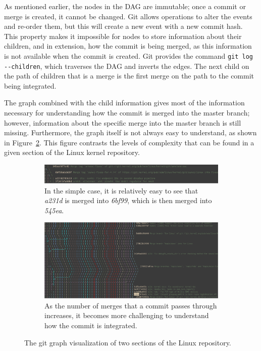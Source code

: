 As mentioned earlier, the nodes in the DAG are immutable;
once a commit or merge is created, it cannot be changed.
Git allows operations to alter the events and re-order them,
but this will create a new event with a new commit hash.
This property makes it impossible for nodes to store information about
their children, and in extension, how the commit is being merged, as
this information is not available when the commit is created.
Git provides the command \verb|git log --children|, which traverses the
DAG and inverts the edges.
The next child on the path of children that is a merge is the first
merge on the path to the commit being integrated.

The graph combined with the child information gives most of the
information necessary for understanding how the commit is
merged into the master branch; however, information about the specific
merge into the master branch is still missing.
Furthermore, the graph itself is not always easy to understand, as shown
in Figure~\ref{fig:git_graphs}.
This figure contrasts the levels of complexity that can be found in a
given section of the Linux kernel repository.

\begin{figure}[htpb]
  \centering
  \begin{subfigure}[b]{0.8\textwidth}
    \includegraphics[width=\textwidth]{Figures/background/git_graph.png}
    \caption{In the simple case, it is relatively easy to see
      that \textit{a231d} is merged into \textit{6bf99},
      which is then merged into \textit{545ea}.}
    \label{fig:trivial_graph}
  \end{subfigure}

  \begin{subfigure}[b]{0.8\textwidth}
    \includegraphics[width=\textwidth]{Figures/background/git_graph_complex.png}
    \caption{As the number of merges that a commit passes through
      increases, it becomes more challenging to understand how the
      commit is integrated.}
  \end{subfigure}
  \caption{The git graph visualization of two sections of the Linux
    repository.}
  \label{fig:git_graphs}
\end{figure}

